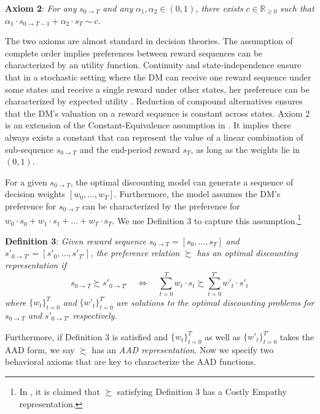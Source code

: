 \documentclass[
  12pt,
]{article}
\begin{document}
\noindent \textbf{Axiom 2}: \emph{For any} \(s_{0\rightarrow T}\)
\emph{and any} \(\alpha_1,\alpha_2 \in (0,1)\)\emph{, there exists}
\(c\in \mathbb{R}_{\geq 0}\) \emph{such that}
\(\alpha_1 \cdot s_{0\rightarrow T-1}+\alpha_2\cdot s_T \sim c\)\emph{.}

The two axioms are almost standard in decision theories. The assumption
of complete order implies preferences between reward sequences can be
characterized by an utility function. Continuity and state-independence
ensure that in a stochastic setting where the DM can receive one reward
sequence under some states and receive a single reward under other
states, her preference can be characterized by expected utility
\citep{herstein1953axiomatic}. Reduction of compound alternatives
ensures that the DM's valuation on a reward sequence is constant across
states. Axiom 2 is an extension of the Constant-Equivalence assumption
in \citet{bleichrodt2008koopmans}. It implies there always exists a
constant that can represent the value of a linear combination of
sub-sequence \(s_{0\rightarrow T}\) and the end-period reward \(s_T\),
as long as the weights lie in \((0,1)\).

For a given \(s_{0\rightarrow T}\), the optimal discounting model can
generate a sequence of decision weights \([w_0,...,w_T]\). Furthermore,
the model assumes the DM's preference for \(s_{0\rightarrow T}\) can be
characterized by the preference for
\(w_0\cdot s_0+w_1\cdot s_1 +...+w_T\cdot s_T\). We use Definition 3 to
capture this assumption.\footnote{In \citep{noor2022optimal}, it is
  claimed that \(\succsim\) satisfying Definition 3 has a Costly Empathy
  representation.}

\noindent \textbf{Definition 3}: \emph{Given reward sequence}
\(s_{0\rightarrow T}=[s_0,...,s_T]\) \emph{and}
\(s'_{0\rightarrow T'}=[s'_0,...,s'_{T'}]\)\emph{, the preference
relation} \(\succsim\) \emph{has an optimal discounting representation
if} \[
s_{0\rightarrow T} \succsim s'_{0\rightarrow T'}\quad
\Longleftrightarrow \quad \sum_{t=0}^T w_t\cdot s_t
\succsim \sum_{t=0}^{T'} w'_t \cdot s'_t
\] \emph{where} \(\{w_t\}_{t=0}^T\) \emph{and} \(\{w'_t\}^{T'}_{t=0}\)
\emph{are solutions to the optimal discounting problems for}
\(s_{0\rightarrow T}\) \emph{and} \(s'_{0\rightarrow T'}\)
\emph{respectively.}

Furthermore, if Definition 3 is satisfied and \(\{w_t\}_{t=0}^T\) as
well as \(\{w'_t\}^{T'}_{t=0}\) takes the AAD form, we say \(\succsim\)
has an \emph{AAD representation}. Now we specify two behavioral axioms
that are key to characterize the AAD functions.
\end{document}
